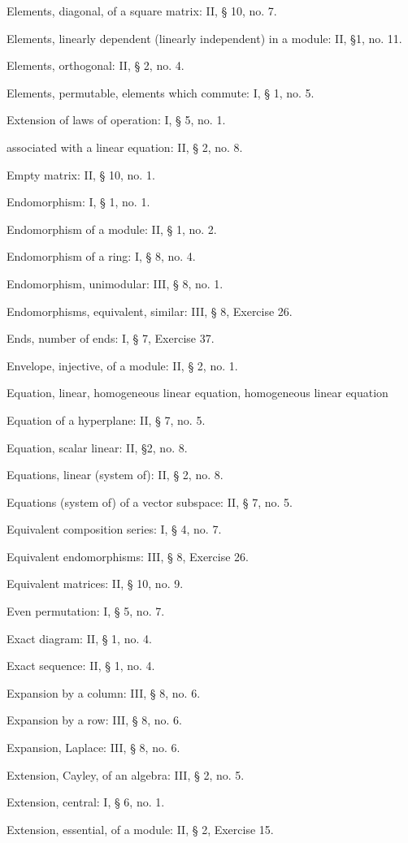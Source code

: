 Elements, diagonal, of a square matrix: II, § 10, no. 7.

Elements, linearly dependent (linearly independent) in a module: II, §1, no. 11.

Elements, orthogonal: II, § 2, no. 4.

Elements, permutable, elements which commute: I, § 1, no. 5.

Extension of laws of operation: I, § 5, no. 1.

associated with a linear equation: II, § 2, no. 8.

Empty matrix: II, § 10, no. 1.

Endomorphism: I, § 1, no. 1.

Endomorphism of a module: II, § 1, no. 2.

Endomorphism of a ring: I, § 8, no. 4.

Endomorphism, unimodular: III, § 8, no. 1.

Endomorphisms, equivalent, similar: III, § 8, Exercise 26.

Ends, number of ends: I, § 7, Exercise 37.

Envelope, injective, of a module: II, § 2, no. 1.

Equation, linear, homogeneous linear equation, homogeneous linear equation

Equation of a hyperplane: II, § 7, no. 5.

Equation, scalar linear: II, §2, no. 8.

Equations, linear (system of): II, § 2, no. 8.

Equations (system of) of a vector subspace: II, § 7, no. 5.

Equivalent composition series: I, § 4, no. 7.

Equivalent endomorphisms: III, § 8, Exercise 26.

Equivalent matrices: II, § 10, no. 9.

Even permutation: I, § 5, no. 7.

Exact diagram: II, § 1, no. 4.

Exact sequence: II, § 1, no. 4.

Expansion by a column: III, § 8, no. 6.

Expansion by a row: III, § 8, no. 6.

Expansion, Laplace: III, § 8, no. 6.

Extension, Cayley, of an algebra: III, § 2, no. 5.

Extension, central: I, § 6, no. 1.

Extension, essential, of a module: II, § 2, Exercise 15.

